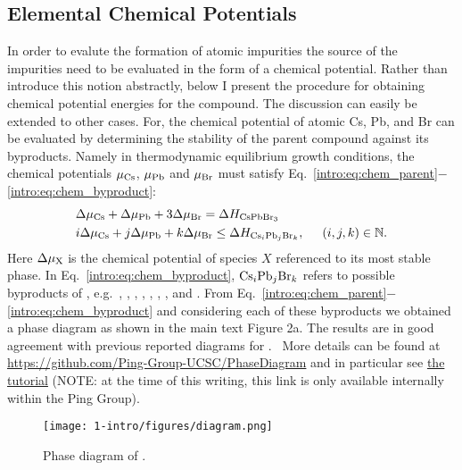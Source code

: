 \subsection{Elemental Chemical Potentials}
In order to evalute the formation of atomic impurities the source of the impurities need to be evaluated in the form of a chemical potential. Rather than introduce this notion abstractly, below I present the procedure for obtaining chemical potential energies for the  compound. The discussion can easily be extended to other cases.
For,  the chemical potential of atomic Cs, Pb, and Br can be evaluated by determining the stability of the parent compound  against its byproducts.
Namely in thermodynamic equilibrium growth conditions, the chemical potentials $\mu_{\rm Cs}$, $\mu_{\rm Pb}$ and $\mu_{\rm Br}$ must satisfy Eq.~\ref{intro:eq:chem_parent}$-$\ref{intro:eq:chem_byproduct}:
\begin{align}
    & \Delta \mu_{\rm Cs} + \Delta \mu_{\rm Pb} + 3\Delta \mu_{\rm Br} = \Delta H_{\ce{CsPbBr3}} \label{intro:eq:chem_parent} \\
    & i\Delta \mu_{\rm Cs} + j\Delta \mu_{\rm Pb} + k\Delta \mu_{\rm Br} \leq \Delta H_{ {\rm Cs}_i {\rm Pb}_j {\rm Br}_k}, \hspace{0.5cm} (i, j, k) \in \mathbb{N}. \label{intro:eq:chem_byproduct}
\end{align}
Here $\Delta \mu_{\rm X}$ is the chemical potential of species $X$ referenced to its most stable phase.
In Eq.~\ref{intro:eq:chem_byproduct}, ${\rm Cs}_i {\rm Pb}_j {\rm Br}_k$ refers to possible byproducts of , e.g.\ , , , , , , , and .
From Eq.~\ref{intro:eq:chem_parent}$-$\ref{intro:eq:chem_byproduct} and considering each of these byproducts we obtained a phase diagram as shown in the main text Figure 2a. The results are in good agreement with previous reported diagrams for .~\cite{kang2017high,li2019sodium}
More details can be found at \url{https://github.com/Ping-Group-UCSC/PhaseDiagram} and in particular see \href{https://github.com/Ping-Group-UCSC/PhaseDiagram/blob/main/Examples/CsPbBr3-PhaseDiagram/diagram.ipynb}{the  tutorial} (NOTE: at the time of this writing, this link is only available internally within the Ping Group).

\begin{figure}[h]
\begin{center}
\texttt{[image: 1-intro/figures/diagram.png]}
    \caption{Phase diagram of .}  \label{intro:fig:mean}
\end{center}
\end{figure}


